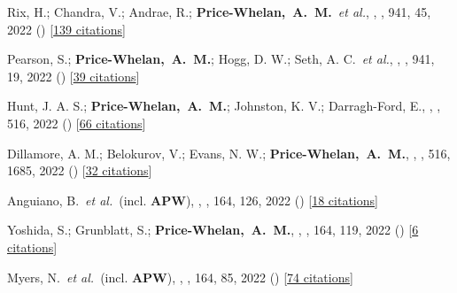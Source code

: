 \item[{\color{deemph}\scriptsize111}]Rix, H.; Chandra, V.; Andrae, R.; \textbf{Price-Whelan,~A.~M.}~\textit{et al.}, , \apj, 941, 45, 2022 () [\href{http://adsabs.harvard.edu/abs/2022ApJ...941...45R}{139 citations}]

\item[{\color{deemph}\scriptsize110}]Pearson, S.; \textbf{Price-Whelan,~A.~M.}; Hogg, D. W.; Seth, A. C.~\textit{et al.}, , \apj, 941, 19, 2022 () [\href{http://adsabs.harvard.edu/abs/2022ApJ...941...19P}{39 citations}]

\item[{\color{deemph}\scriptsize109}]Hunt, J. A. S.; \textbf{Price-Whelan,~A.~M.}; Johnston, K. V.; Darragh-Ford, E., , \mnras, 516, 2022 () [\href{http://adsabs.harvard.edu/abs/2022MNRAS.516L...7H}{66 citations}]

\item[{\color{deemph}\scriptsize108}]Dillamore, A. M.; Belokurov, V.; Evans, N. W.; \textbf{Price-Whelan,~A.~M.}, , \mnras, 516, 1685, 2022 () [\href{http://adsabs.harvard.edu/abs/2022MNRAS.516.1685D}{32 citations}]

\item[{\color{deemph}\scriptsize107}]Anguiano, B.~\textit{et al.}~(incl. \textbf{APW}), , \aj, 164, 126, 2022 () [\href{http://adsabs.harvard.edu/abs/2022AJ....164..126A}{18 citations}]

\item[{\color{deemph}\scriptsize106}]Yoshida, S.; Grunblatt, S.; \textbf{Price-Whelan,~A.~M.}, , \aj, 164, 119, 2022 () [\href{http://adsabs.harvard.edu/abs/2022AJ....164..119Y}{6 citations}]

\item[{\color{deemph}\scriptsize105}]Myers, N.~\textit{et al.}~(incl. \textbf{APW}), , \aj, 164, 85, 2022 () [\href{http://adsabs.harvard.edu/abs/2022AJ....164...85M}{74 citations}]

